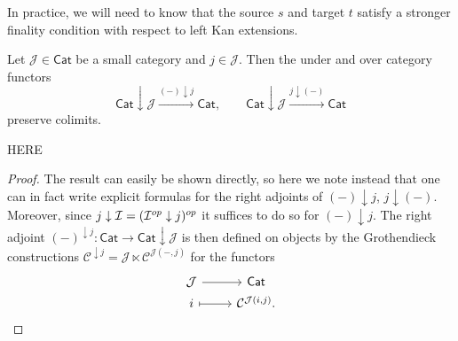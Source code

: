 \documentclass[a4paper,10pt]{article}%
\begin{document}
In practice, we will need to know that the source $s$ and target $t$ satisfy a stronger finality condition with respect to left Kan extensions.


\begin{lemma}\label{UNDERLEFTADJ LEM}
Let $\mathcal{J} \in \mathsf{Cat}$ be a small category and 
$j \in \mathcal{J}$. 
Then the under and over category functors
\[
	\mathsf{Cat} \downarrow \mathcal{J}
		\xrightarrow{(\minus) \downarrow j}
	\mathsf{Cat},
\qquad
	\mathsf{Cat} \downarrow \mathcal{J}
		\xrightarrow{j \downarrow (\minus)}
	\mathsf{Cat}
\]
preserve colimits.
\end{lemma}

{\color{red} HERE}

\begin{proof}
The result can easily be shown directly,
so here we note instead that one can in fact
 write explicit formulas for the right adjoints
of
$(\minus) \downarrow j$,
$j \downarrow (\minus)$.
Moreover, since $j \downarrow \mathcal{I} = (\mathcal{I}^{op} \downarrow j)^{op}$ 
it suffices to do so for $(\minus) \downarrow j$.
The right adjoint
$(\minus)^{\downarrow j} \colon
\mathsf{Cat}
	\to 
\mathsf{Cat} \downarrow \mathcal{J}
$
is then defined on objects by the Grothendieck constructions
$\mathcal{C}^{\downarrow j}
= \mathcal{J} \ltimes \mathcal{C}^{\mathcal{J}(\minus,j)}$
for the functors
\[
\begin{tikzcd}[row sep = 0em]
	\mathcal{J} \ar{r} & \mathsf{Cat} \\
	i \ar[mapsto]{r} & \C^{\mathcal{J}(i,j)}.
\end{tikzcd}
\]
\end{proof}
%
%	
%
\end{document}
